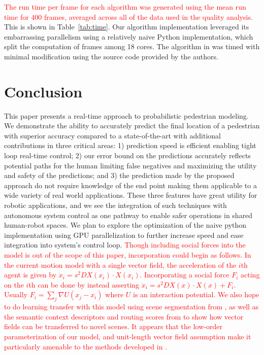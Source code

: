 \documentclass[letterpaper,10pt,conference]{ieeeconf}
\newcommand{\rtext}[1]{\textcolor{red}{#1}}
\begin{document}
\rtext{The run time per frame for each algorithm was generated using the mean run time for 400 frames, averaged across all of the data used in the quality analysis.}
This is shown in Table~\ref{tab:time}. 
Our algorithm implementation leveraged its embarrassing parallelism using a relatively naive Python implementation, which split the computation of frames among 18 cores. 
The algorithm in \cite{Kitani2012} was timed with minimal modification using the source code provided by the authors. 


\section{Conclusion} 
\label{sec:conclusion}
This paper presents a real-time approach to probabilistic pedestrian modeling. 
We demonstrate the ability to accurately predict the final location of a pedestrian with superior accuracy compared to a state-of-the-art with additional contributions in three critical areas: 1) prediction speed is efficient enabling tight loop real-time control;  2) our error bound on the predictions accurately reflects potential paths for the human limiting false negatives and maximizing the utility and safety of the predictions; and 3) the prediction made by the proposed approach do not require knowledge of the end point  making them applicable to a wide variety of real world applications. 
These three features have great utility for robotic applications, and we see the integration of such techniques with autonomous system control as one pathway to enable safer operations in shared human-robot spaces. 
We plan to explore the optimization of the naive python implementation using GPU parallelization to further increase speed and ease integration into system's control loop. \rtext{Though including social forces into the model is out of the scope of this paper, incorporation could begin as follows.  In the current motion model with a single vector field, the acceleration of the $i$th agent is given by $\ddot{x}_i = s^2 DX(x_i) \cdot X(x_i)$.  Incorporating a social force $F_{i}$ acting on the $i$th can be done by instead asserting $\ddot{x}_i = s^2 DX(x) \cdot X(x) + F_i$.  Usually $F_{i} = \sum_{j} \nabla U( x_j - x_i)$ where $U$ is an interaction potential.} \rtext{We also hope to do learning transfer with this model using scene segmentation from \cite{Walker2014}, as well as the semantic context descriptors and routing scores from \cite{Ballan2016} to show how vector fields can be transferred to novel scenes. It appears that the low-order parameterization of our model, and unit-length vector field assumption make it particularly amenable to the methods developed in \cite{Ballan2016}.}
\end{document}
